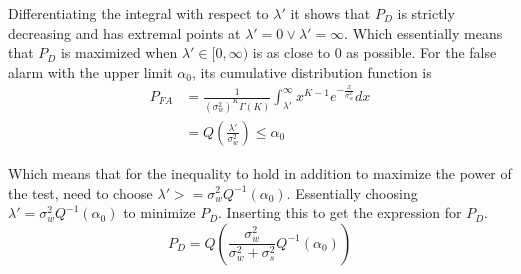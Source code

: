 Differentiating the integral with respect to $\lambda'$ it shows that $P_D$ is strictly decreasing and has extremal points at $\lambda'=0\vee\lambda'=\infty$. Which essentially means that $P_D$ is maximized when $\lambda'\in[0,\infty)$ is as close to $0$ as possible. For the false alarm with the upper limit $\alpha_0$, its cumulative distribution function is
\begin{align}
    P_{FA} & = \frac{1}{(\sigma_w^2)^K\Gamma(K)}\int_{\lambda'}^{\infty}x^{K-1}e^{-\frac{x}{\sigma_w^2}}dx\nonumber\\
    & = Q\left(\frac{\lambda'}{\sigma_w^2}\right) \leq \alpha_0
\end{align}

Which means that for the inequality to hold in addition to maximize the power of the test, need to choose $\lambda' >= \sigma_w^2Q^{-1}\left(\alpha_0\right)$. Essentially choosing $\lambda' = \sigma_w^2Q^{-1}\left(\alpha_0\right)$ to minimize $P_D$. Inserting this to get the expression for $P_D$.
\begin{equation}
    P_D = Q(\frac{\sigma_w^2}{\sigma_w^2+\sigma_s^2}Q^{-1}\left(\alpha_0\right))
\end{equation}

